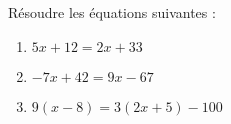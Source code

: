 \begin{minipage}{0.99\linewidth}

\exo

Résoudre les équations suivantes :

\begin{multicols}{3}

\begin{enumerate}

\item $ 5x+12 = 2x + 33$ 
\item $ -7x+42 = 9x - 67 $ 
\item $ 9(x-8)= 3(2x+5) - 100 $ 


\end{enumerate}

\end{multicols}

\end{minipage}

\vspace{0.5cm}